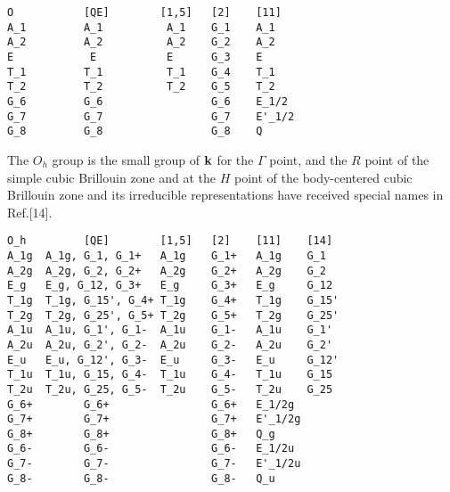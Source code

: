 \documentclass[12pt,a4paper,twoside]{report}
\begin{document}
\begin{tcolorbox}
\begin{footnotesize}
\begin{verbatim}
O           [QE]        [1,5]   [2]    [11]
A_1         A_1          A_1    G_1    A_1
A_2         A_2          A_2    G_2    A_2
E            E           E      G_3    E
T_1         T_1          T_1    G_4    T_1
T_2         T_2          T_2    G_5    T_2
G_6         G_6                 G_6    E_1/2
G_7         G_7                 G_7    E'_1/2
G_8         G_8                 G_8    Q
\end{verbatim}
\end{footnotesize}
\end{tcolorbox}

The $O_h$ group is the small group of ${\bf k}$ for the $\Gamma$ point, 
and the $R$ point of the simple cubic Brillouin zone and at
the $H$ point of the body-centered cubic Brillouin zone and its irreducible
representations have received special names in Ref.[14].

\begin{tcolorbox}
\begin{footnotesize}
\begin{verbatim}
O_h         [QE]        [1,5]   [2]    [11]    [14]
A_1g  A_1g, G_1, G_1+   A_1g    G_1+   A_1g    G_1
A_2g  A_2g, G_2, G_2+   A_2g    G_2+   A_2g    G_2
E_g   E_g, G_12, G_3+   E_g     G_3+   E_g     G_12
T_1g  T_1g, G_15', G_4+ T_1g    G_4+   T_1g    G_15'
T_2g  T_2g, G_25', G_5+ T_2g    G_5+   T_2g    G_25'
A_1u  A_1u, G_1', G_1-  A_1u    G_1-   A_1u    G_1'
A_2u  A_2u, G_2', G_2-  A_2u    G_2-   A_2u    G_2'
E_u   E_u, G_12', G_3-  E_u     G_3-   E_u     G_12'
T_1u  T_1u, G_15, G_4-  T_1u    G_4-   T_1u    G_15
T_2u  T_2u, G_25, G_5-  T_2u    G_5-   T_2u    G_25
G_6+        G_6+                G_6+   E_1/2g
G_7+        G_7+                G_7+   E'_1/2g
G_8+        G_8+                G_8+   Q_g
G_6-        G_6-                G_6-   E_1/2u
G_7-        G_7-                G_7-   E'_1/2u
G_8-        G_8-                G_8-   Q_u
\end{verbatim} 
\end{footnotesize}
\end{tcolorbox}


\newpage
\end{document}
